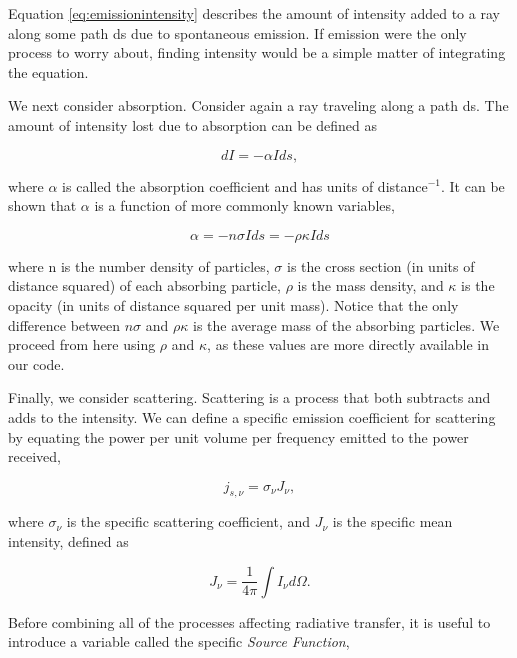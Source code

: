 Equation \ref{eq:emissionintensity} describes the amount of intensity added to a ray along some path ds due to spontaneous emission. If emission were the only process to worry about, finding intensity would be a simple matter of integrating the equation.

We next consider absorption. Consider again a ray traveling along a path ds. The amount of intensity lost due to absorption can be defined as

\begin{equation}
\label{eq:absorption}
dI = -\alpha I ds,
\end{equation}

where $\alpha$ is called the absorption coefficient and has units of distance$^{-1}$. It can be shown \citep{rybickiLightman86} that $\alpha$ is a function of more commonly known variables,

\begin{equation}
\label{eq:absorptioncoeff}
\alpha = -n \sigma I ds = -\rho \kappa I ds
\end{equation}

where n is the number density of particles, $\sigma$ is the cross section (in units of distance squared) of each absorbing particle, $\rho$ is the mass density, and $\kappa$ is the opacity (in units of distance squared per unit mass). Notice that the only difference between $n \sigma$ and $\rho \kappa$ is the average mass of the absorbing particles. We proceed from here using $\rho$ and $\kappa$, as these values are more directly available in our code.

Finally, we consider scattering. Scattering is a process that both subtracts and adds to the intensity. We can define a specific emission coefficient for scattering by equating the power per unit volume per frequency emitted to the power received,

\begin{equation}
\label{eq:scatteringcoefficient}
j_{s,\nu} = \sigma_{\nu} J_{\nu},
\end{equation}

where $\sigma_{\nu}$ is the specific scattering coefficient, and $J_{\nu}$ is the specific mean intensity, defined as

\begin{equation}
\label{eq:meanintensity}
J_{\nu} = \frac{1}{4\pi}\int I_{\nu} d\Omega.
\end{equation}

Before combining all of the processes affecting radiative transfer, it is useful to introduce a variable called the specific \emph{Source Function},

